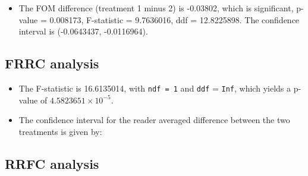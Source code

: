 \documentclass[]{book}
\newenvironment{Shaded}{\begin{snugshade}}{\end{snugshade}}
\newcommand{\CommentTok}[1]{\textcolor[rgb]{0.56,0.35,0.01}{\textit{#1}}}
\newcommand{\NormalTok}[1]{#1}
\newcommand{\OperatorTok}[1]{\textcolor[rgb]{0.81,0.36,0.00}{\textbf{#1}}}
\providecommand{\tightlist}{%
  \setlength{\itemsep}{0pt}\setlength{\parskip}{0pt}}
\begin{document}
\begin{itemize}
\tightlist
\item
  The FOM difference (treatment 1 minus 2) is -0.03802, which is significant, p-value = 0.008173, F-statistic = 9.7636016, ddf = 12.8225898. The confidence interval is (-0.0643437, -0.0116964).
\end{itemize}

\hypertarget{frrc-analysis}{%
\subsection{FRRC analysis}\label{frrc-analysis}}

\begin{Shaded}
\end{Shaded}

\begin{itemize}
\item
  The F-statistic is 16.6135014, with \texttt{ndf\ =\ 1} and \texttt{ddf} = \texttt{Inf}, which yields a p-value of \ensuremath{4.5823651\times 10^{-5}}.
\item
  The confidence interval for the reader averaged difference between the two treatments is given by:
\end{itemize}

\begin{Shaded}
\end{Shaded}

\hypertarget{rrfc-analysis}{%
\subsection{RRFC analysis}\label{rrfc-analysis}}
\end{document}
